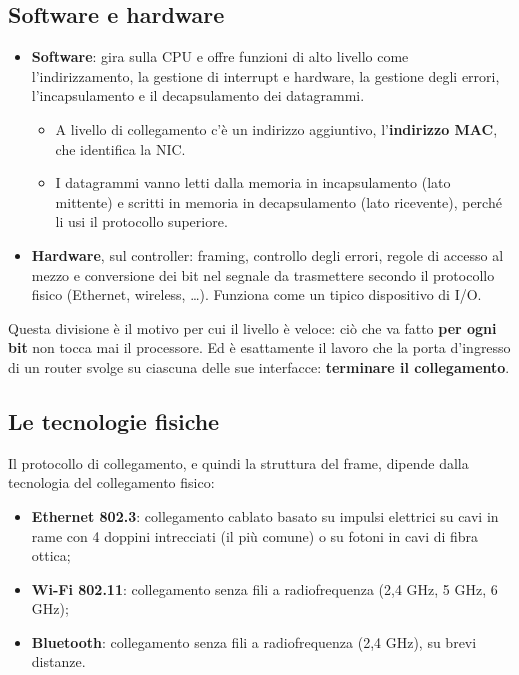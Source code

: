 \subsection{Software e hardware}

\begin{itemize}
    \item \textbf{Software}: gira sulla CPU e offre funzioni di alto livello come l'indirizzamento, la gestione di interrupt e
          hardware, la gestione degli errori, l'incapsulamento e il decapsulamento dei datagrammi.
    \begin{itemize}
      \item A livello di collegamento c'è un indirizzo aggiuntivo, l'\textbf{indirizzo MAC}, che identifica la NIC.
      \item I datagrammi vanno letti dalla memoria in incapsulamento (lato mittente) e scritti in memoria in decapsulamento (lato
            ricevente), perché li usi il protocollo superiore.
    \end{itemize}
    \item \textbf{Hardware}, sul controller: framing, controllo degli errori, regole di accesso al mezzo e conversione dei bit nel
          segnale da trasmettere secondo il protocollo fisico (Ethernet, wireless, \dots). Funziona come un tipico dispositivo di I/O.
\end{itemize}

Questa divisione è il motivo per cui il livello è veloce: ciò che va fatto \textbf{per ogni bit} non tocca mai il processore. Ed è
esattamente il lavoro che la porta d'ingresso di un router svolge su ciascuna delle sue interfacce: \textbf{terminare il
collegamento}.

\subsection{Le tecnologie fisiche}

Il protocollo di collegamento, e quindi la struttura del frame, dipende dalla tecnologia del collegamento fisico:

\begin{itemize}
    \item \textbf{Ethernet 802.3}: collegamento cablato basato su impulsi elettrici su cavi in rame con 4 doppini intrecciati (il più
          comune) o su fotoni in cavi di fibra ottica;
    \item \textbf{Wi-Fi 802.11}: collegamento senza fili a radiofrequenza (2,4 GHz, 5 GHz, 6 GHz);
    \item \textbf{Bluetooth}: collegamento senza fili a radiofrequenza (2,4 GHz), su brevi distanze.
\end{itemize}

